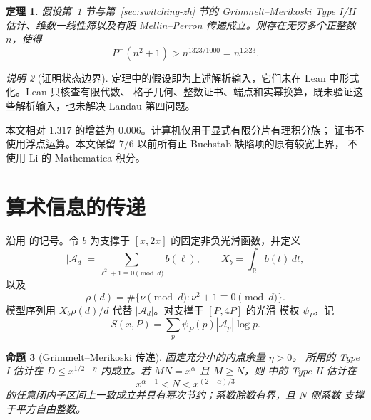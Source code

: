\documentclass[UTF8,10pt,a4paper]{ctexart}
\newcommand{\Pplus}{P^{+}}
\newcommand{\Acal}{\mathcal{A}}
\newcommand{\1}{\mathbf{1}}
\newtheorem{theorem}{定理}[section]
\newtheorem{proposition}[theorem]{命题}
\theoremstyle{remark}
\newtheorem{remark}[theorem]{说明}
\begin{document}
\begin{theorem}\label{thm:main-zh}
假设第~\ref{sec:transfer-zh} 节与第~\ref{sec:switching-zh} 节的
Grimmelt--Merikoski Type I/II 估计、维数一线性筛以及有限 Mellin--Perron
传递成立。则存在无穷多个正整数 $n$，使得
\[
  \Pplus(n^2+1)>n^{1323/1000}=n^{1.323}.
\]
\end{theorem}

\begin{remark}[证明状态边界]
定理中的假设即为上述解析输入，它们未在 Lean 中形式化。Lean 只核查有限代数、
格子几何、整数证书、端点和实幂换算，既未验证这些解析输入，也未解决
Landau 第四问题。
\end{remark}

本文相对 $1.317$ 的增益为 $0.006$。计算机仅用于显式有限分片有理积分族；
证书不使用浮点运算。本文保留 $7/6$ 以前所有正 Buchstab 缺陷项的原有较宽上界，
不使用 Li 的 Mathematica 积分。

\section{算术信息的传递}\label{sec:transfer-zh}

沿用 \cite[Section 2]{Merikoski2020} 的记号。令 $b$ 为支撑于 $[x,2x]$
的固定非负光滑函数，并定义
\[
  |\Acal_d|=\sum_{\ell^2+1\equiv0\pmod d}b(\ell),
  \qquad X_b=\int_{\mathbb R}b(t)\,dt,
\]
以及
\[
  \rho(d)=\#\{\nu\pmod d:\nu^2+1\equiv0\pmod d\}.
\]
模型序列用 $X_b\rho(d)/d$ 代替 $|\Acal_d|$。对支撑于 $[P,4P]$ 的光滑
模权 $\psi_P$，记
\[
  S(x,P)=\sum_p\psi_P(p)|\Acal_p|\log p.
\]

\begin{proposition}[Grimmelt--Merikoski 传递]\label{prop:transfer-zh}
固定充分小的内点余量 $\eta>0$。\cite[Proposition 3]{Merikoski2020}
所用的 Type I 估计在 $D\le x^{1/2-\eta}$ 内成立。若
$MN=x^\alpha$ 且 $M\ge N$，则 \cite[Proposition 4(i)]{Merikoski2020}
中的 Type II 估计在
\begin{equation}\label{eq:typeII-zh}
  x^{\alpha-1}<N<x^{(2-\alpha)/3}
\end{equation}
的任意闭内子区间上一致成立并具有幂次节约；系数除数有界，且 $N$ 侧系数
支撑于平方自由整数。
\end{proposition}
\end{document}
